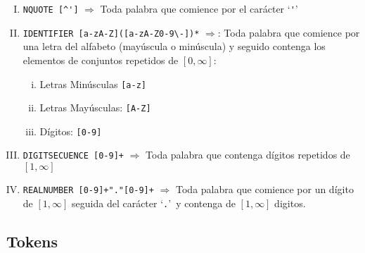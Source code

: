 \begin{enumerate}[I.]

\item {\verb#NQUOTE [^']#} $\Rightarrow$ Toda palabra que comience por el carácter  `{\verb#'#}'

\item {\verb#IDENTIFIER [a-zA-Z]([a-zA-Z0-9\-])*#} $\Rightarrow$: Toda palabra que comience por una letra del alfabeto (mayúscula o minúscula) y seguido contenga los elementos de conjuntos repetidos de $[0,\infty]$:{

\begin{enumerate}[i.]
\item Letras Minúsculas {\verb#[a-z]#} 

\item Letras Mayúsculas: {\verb#[A-Z]#} 

\item Dígitos: {\verb#[0-9]#} 

\end{enumerate}

}
\item {\verb#DIGITSECUENCE [0-9]+#} $\Rightarrow$ Toda palabra que contenga dígitos repetidos de $[1,\infty]$

\item {\verb#REALNUMBER	[0-9]+"."[0-9]+#} $\Rightarrow$ Toda palabra que comience por un dígito de $[1,\infty]$ seguida del carácter `{\verb#.#}'\ y contenga de $[1,\infty]$ digitos.

\end{enumerate}

%




\subsection{Tokens}


